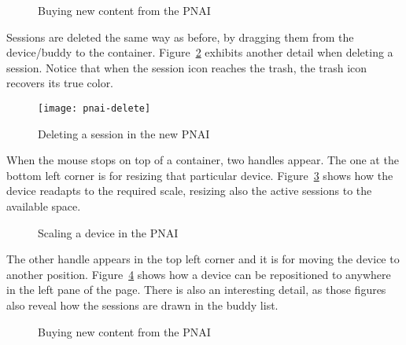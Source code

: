 \begin{figure}[htbp]
  \centering
  \caption{Buying new content from the PNAI}
  \label{fig:pnai-buy-content}
\end{figure}

Sessions are deleted the same way as before, by dragging them from the device/buddy to the container.
Figure~\ref{fig:pnai-delete} exhibits another detail when deleting a session.
Notice that when the session icon reaches the trash, the trash icon recovers its true color.

\begin{figure}[htbp]
  \centering
    \texttt{[image: pnai-delete]}
  \caption{Deleting a session in the new PNAI}
  \label{fig:pnai-delete}
\end{figure}

When the mouse stops on top of a container, two handles appear.
The one at the bottom left corner is for resizing that particular device.
Figure~\ref{fig:pnai-scale} shows how the device readapts to the required scale, resizing also the active sessions to the available space.

\begin{figure}[htbp]
  \centering
  \caption{Scaling a device in the PNAI}
  \label{fig:pnai-scale}
\end{figure}

The other handle appears in the top left corner and it is for moving the device to another position.
Figure~\ref{fig:pnai-move} shows how a device can be repositioned to anywhere in the left pane of the page.
There is also an interesting detail, as those figures also reveal how the sessions are drawn in the buddy list.

\begin{figure}[htbp]
  \centering
  \caption{Buying new content from the PNAI}
  \label{fig:pnai-move}
\end{figure}

